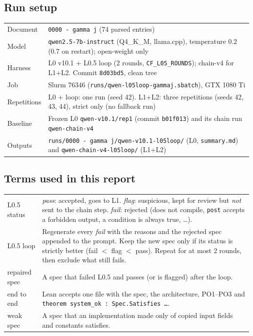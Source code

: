 \documentclass[10pt,a4paper]{article}
\newcommand{\code}[1]{\texttt{\small #1}}
\begin{document}
\subsection{Run setup}
\begin{tabularx}{\linewidth}{@{}lX@{}}
\toprule
Document    & \code{0000 - gamma j} (74 parsed entries) \\
Model       & \code{qwen2.5-7b-instruct} (Q4\_K\_M, llama.cpp), temperature 0.2 (0.7 on restart); open-weight only \\
Harness     & L0 v10.1 + L0.5 loop (2 rounds, \code{CF\_L05\_ROUNDS}); chain-v4 for L1+L2. Commit \code{8d03bd5}, clean tree \\
Job         & Slurm 76346 (\code{runs/qwen-l05loop-gammaj.sbatch}), GTX 1080 Ti \\
Repetitions & L0 + loop: one run (seed 42). L1+L2: three repetitions (seeds 42, 43, 44), strict only (no fallback run) \\
Baseline    & Frozen L0 \code{qwen-v10.1/rep1} (commit \code{b01f013}) and its chain run \code{qwen-chain-v4} \\
Outputs     & \code{runs/0000 - gamma j/qwen-v10.1-l05loop/} (L0, \code{summary.md}) and \code{qwen-chain-v4-l05loop/} (L1+L2) \\
\bottomrule
\end{tabularx}

\subsection{Terms used in this report}
\begin{tabularx}{\linewidth}{@{}lX@{}}
\toprule
L0.5 status & \emph{pass}: accepted, goes to L1. \emph{flag}: suspicious, kept for review but \emph{not} sent to the chain step.
     \emph{fail}: rejected (does not compile, \code{post} accepts a forbidden output, a condition is always true, \dots). \\
L0.5 loop & Regenerate every \emph{fail} with the reasons and the rejected spec appended to the prompt. Keep the new spec only if
     its status is strictly better (fail $<$ flag $<$ pass). Repeat for at most 2 rounds, then exclude what still fails. \\
repaired spec & A spec that failed L0.5 and passes (or is flagged) after the loop. \\
end to end & Lean accepts one file with the spec, the architecture, PO1--PO3 and \code{theorem system\_ok : Spec.Satisfies \dots}. \\
weak spec & A spec that an implementation made only of copied input fields and constants satisfies. \\
\bottomrule
\end{tabularx}
\end{document}
